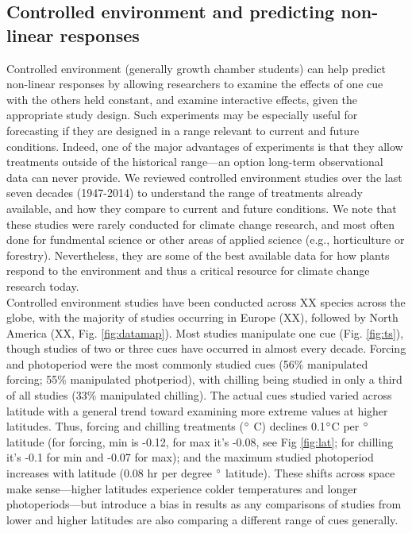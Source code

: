 \documentclass[11pt,letter]{article}
\begin{document}
\subsection{Controlled environment and predicting non-linear responses}

Controlled environment (generally growth chamber students) can help predict non-linear responses by allowing researchers to examine the effects of one cue with the others held constant, and examine interactive effects, given the appropriate study design. Such experiments may be especially useful for forecasting if they are designed in a range relevant to current and future conditions. Indeed, one of the major advantages of experiments is that they allow treatments outside of the historical range---an option long-term observational data can never provide. We reviewed controlled environment studies over the last seven decades (1947-2014) to understand the range of treatments already available, and how they compare to current and future conditions. We note that these studies were rarely conducted for climate change research, and most often done for fundmental science or other areas of applied science (e.g., horticulture or forestry). Nevertheless, they are some of the best available data for how plants respond to the environment and thus a critical resource for climate change research today.\\

Controlled environment studies have been conducted across XX species across the globe, with the majority of studies occurring in Europe (XX), followed by North America (XX, Fig. \ref{fig:datamap}). Most studies manipulate one cue (Fig. \ref{fig:ts}), though studies of two or three cues have occurred in almost every decade. Forcing and photoperiod were the most commonly studied cues (56\% manipulated forcing; 55\% manipulated photperiod), with chilling being studied in only a third of all studies (33\% manipulated chilling). The actual cues studied varied across latitude with a general trend toward examining more extreme values at higher latitudes. Thus, forcing and chilling treatments ($\degree$ C) declines 0.1$\degree$C per $\degree$ latitude (for forcing, min is -0.12, for max it's -0.08, see Fig \ref{fig:lat}; for chilling it's -0.1 for min and -0.07 for max); and the maximum studied photoperiod increases with latitude (0.08 hr per degree $\degree$ latitude). These shifts across space make sense---higher latitudes experience colder temperatures and longer photoperiods---but introduce a bias in results as any comparisons of studies from lower and higher latitudes are also comparing a different range of cues generally. \\
\end{document}
